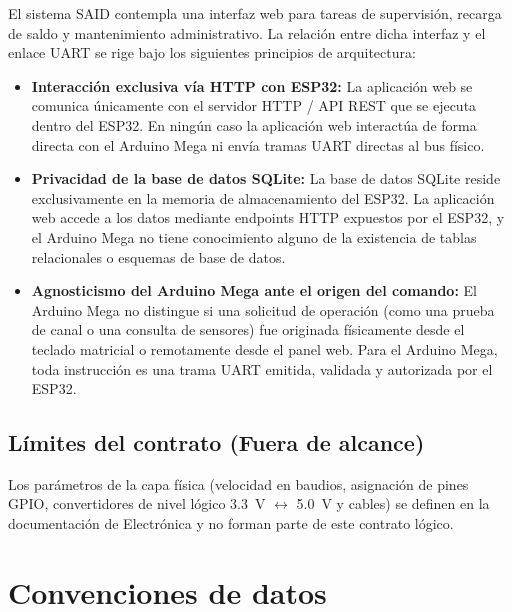 \documentclass[a4paper,11pt]{article}
\begin{document}
El sistema SAID contempla una interfaz web para tareas de supervisión, recarga
de saldo y mantenimiento administrativo. La relación entre dicha interfaz y el
enlace UART se rige bajo los siguientes principios de arquitectura:

\begin{itemize}[leftmargin=1.6em]
    \item \textbf{Interacción exclusiva vía HTTP con ESP32:} La aplicación web
    se comunica únicamente con el servidor HTTP / API REST que se ejecuta dentro del
    ESP32. En ningún caso la aplicación web interactúa de forma directa con el
    Arduino Mega ni envía tramas UART directas al bus físico.
    \item \textbf{Privacidad de la base de datos SQLite:} La base de datos SQLite
    reside exclusivamente en la memoria de almacenamiento del ESP32. La aplicación web
    accede a los datos mediante endpoints HTTP expuestos por el ESP32, y el Arduino Mega
    no tiene conocimiento alguno de la existencia de tablas relacionales o esquemas de base de datos.
    \item \textbf{Agnosticismo del Arduino Mega ante el origen del comando:}
    El Arduino Mega no distingue si una solicitud de operación (como una prueba de canal
    o una consulta de sensores) fue originada físicamente desde el teclado matricial
    o remotamente desde el panel web. Para el Arduino Mega, toda instrucción es una
    trama UART emitida, validada y autorizada por el ESP32.
\end{itemize}

\subsection{Límites del contrato (Fuera de alcance)}

Los parámetros de la capa física (velocidad en baudios, asignación de pines GPIO,
convertidores de nivel lógico 3.3~V $\leftrightarrow$ 5.0~V y cables) se definen
en la documentación de Electrónica y no forman parte de este contrato lógico.


\clearpage

\section{Convenciones de datos}
\end{document}
